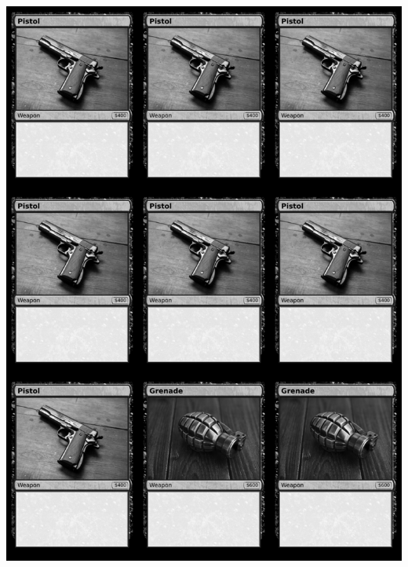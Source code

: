 \documentclass[a4paper]{article}
\begin{document}
\begin{center}
	\centering
	\includegraphics[width=190.5mm,height=266.7mm]{output/temp/page7.png}
\end{center}

\newpage
\end{document}
